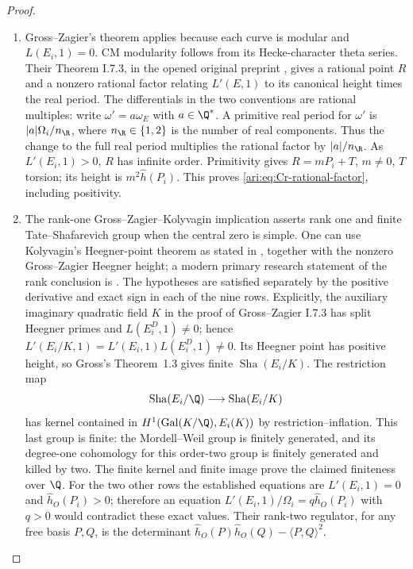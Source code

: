 \begin{proof}
\begin{enumerate}[label=\arabic*.,leftmargin=*]
\item Gross--Zagier's theorem applies because each curve is modular and
$L(E_i,1)=0$. CM modularity follows from its Hecke-character
theta series. Their Theorem I.7.3, in the opened original
preprint \citep{CrGrossZagier1986}, gives a rational point $R$ and
a nonzero rational factor relating $L'(E,1)$ to its canonical
height times the real period. The differentials in the two conventions are rational multiples:
write $\omega'=a\omega_E$ with $a\in\Q^*$.  A primitive real
period for $\omega'$ is $|a|\Omega_i/n_{\R}$, where
$n_{\R}\in\{1,2\}$ is the number of real components.
Thus the change to the full real period multiplies the rational
factor by $|a|/n_{\R}$.
As $L'(E_i,1)>0$, $R$ has infinite order. Primitivity gives
$R=mP_i+T$, $m\ne0$, $T$ torsion; its height is
$m^2\widehat h(P_i)$. This proves
\eqref{ari:eq:Cr-rational-factor}, including positivity.

\item The rank-one Gross--Zagier--Kolyvagin implication asserts rank one
and finite Tate--Shafarevich group when the central zero is simple.
One can use Kolyvagin's Heegner-point theorem as stated in
\citet[Theorem 1.3]{CrGross1991}, together with the nonzero
Gross--Zagier Heegner height; a modern primary research statement
of the rank conclusion is \citet[Theorem 1.1]{CrJetchev2008}.
The hypotheses are satisfied separately by the positive derivative
and exact sign in each of the nine rows.  Explicitly, the auxiliary
imaginary quadratic field $K$ in the proof of Gross--Zagier I.7.3
has split Heegner primes and $L(E_i^D,1)\ne0$; hence
$L'(E_i/K,1)=L'(E_i,1)L(E_i^D,1)\ne0$.  Its Heegner point has
positive height, so Gross's Theorem~1.3 gives finite
$\operatorname{Sha}(E_i/K)$.  The restriction map
\[
\operatorname{Sha}(E_i/\Q)\longrightarrow
\operatorname{Sha}(E_i/K)
\]
has kernel contained in
$H^1(\operatorname{Gal}(K/\Q),E_i(K))$ by restriction--inflation.
This last group is finite: the Mordell--Weil group is finitely
generated, and its degree-one cohomology for this order-two group
is finitely generated and killed by two.  The finite kernel and
finite image prove the claimed finiteness over $\Q$.
For the two other rows the established equations are
$L'(E_i,1)=0$ and $\widehat h_O(P_i)>0$; therefore an equation
$L'(E_i,1)/\Omega_i=q\widehat h_O(P_i)$ with $q>0$ would contradict
these exact values.  Their rank-two regulator, for any free basis
$P,Q$, is the determinant
$\widehat h_O(P)\widehat h_O(Q)-\langle P,Q\rangle^2$.
\end{enumerate}
\end{proof}